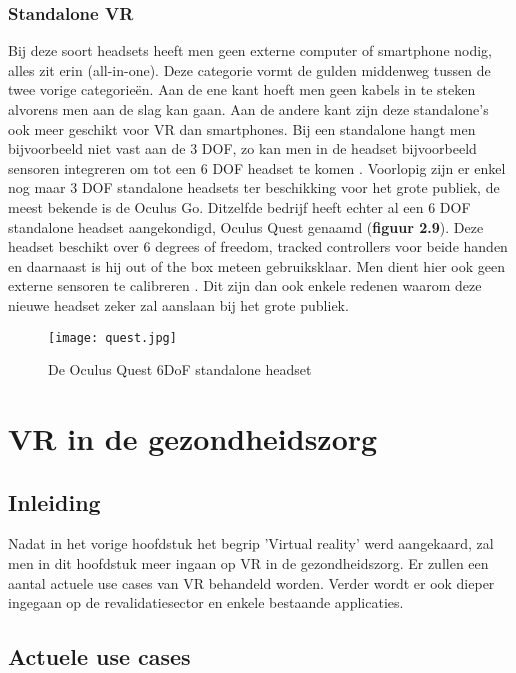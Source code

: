 \subsection{Standalone VR}
Bij deze soort headsets heeft men geen externe computer of smartphone nodig, alles zit erin (all-in-one). Deze categorie vormt de gulden middenweg tussen de twee vorige categorieën. Aan de ene kant hoeft men geen kabels in te steken alvorens men aan de slag kan gaan. Aan de andere kant zijn deze standalone's ook meer geschikt voor VR dan smartphones. Bij een standalone hangt men bijvoorbeeld niet vast aan de 3 DOF, zo kan men in de headset bijvoorbeeld sensoren integreren om tot een 6 DOF headset te komen  \autocite{Cherdo2018}. Voorlopig zijn er enkel nog maar 3 DOF standalone headsets ter beschikking voor het grote publiek, de meest bekende is de Oculus Go. Ditzelfde bedrijf heeft echter al een 6 DOF standalone headset aangekondigd, Oculus Quest genaamd (\textbf{figuur 2.9}). Deze headset beschikt over 6 degrees of freedom, tracked controllers voor beide handen en daarnaast is hij out of the box meteen gebruiksklaar. Men dient hier ook geen externe sensoren te calibreren  \autocite{Oculus2019}. Dit zijn dan ook enkele redenen waarom deze nieuwe headset zeker zal aanslaan bij het grote publiek.

\begin{figure}[h]
    \centering
    \texttt{[image: quest.jpg]}
    \caption{De Oculus Quest 6DoF standalone headset \autocite{Oculus2019}}
\end{figure}


\chapter{VR in de gezondheidszorg}
\section{Inleiding}
Nadat in het vorige hoofdstuk het begrip 'Virtual reality' werd aangekaard, zal men in dit hoofdstuk meer ingaan op VR in de gezondheidszorg. Er zullen een aantal actuele use cases van VR behandeld worden. Verder wordt er ook dieper ingegaan op de revalidatiesector en enkele bestaande applicaties.

\section{Actuele use cases}
